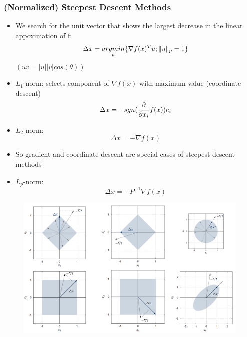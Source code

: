 \subsubsection*{(Normalized) Steepest Descent Methods}
\begin{itemize}
    \item
        We search for the unit vector that shows the largest decrease in the linear appoximation of f:
        $$ \Delta x = \underset{u}{argmin}\{\nabla f(x)^T u; \lVert u\rVert_p = 1\}$$ $(uv = |u||v|cos(\theta))$
    \item
        $L_1$-norm: selects component of $\nabla f(x)$ with maximum value (coordinate descent)
        $$ \Delta x = -sgn(\frac{\displaystyle \partial}{\displaystyle \partial x_i} f(x)) e_i$$
    \item
        $L_2$-norm:
        $$ \Delta x = - \nabla f(x)$$
    \item
        So gradient and coordinate descent are special cases of steepest descent methods
    \item
        $L_p$-norm:
        $$ \Delta x = - P^{-1} \nabla f(x)$$
\end{itemize}

\begin{figure}[H]
    \centering
    \includegraphics[scale=0.4]{figures/steep}
\end{figure}

